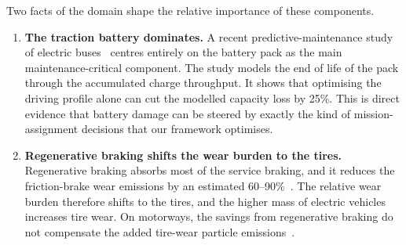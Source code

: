 \documentclass[11pt,a4paper]{article}
\theoremstyle{plain}
\theoremstyle{definition}
\theoremstyle{remark}
\begin{document}
Two facts of the domain shape the relative importance of these components.
\begin{enumerate}
  \item \textbf{The traction battery dominates.}
    A recent predictive-maintenance study of electric buses~\cite[Secs.~2,~4.2]{Ibrahim2025} centres entirely on the battery pack as the main maintenance-critical component.
    The study models the end of life of the pack through the accumulated charge throughput.
    It shows that optimising the driving profile alone can cut the modelled capacity loss by 25\%.
    This is direct evidence that battery damage can be steered by exactly the kind of mission-assignment decisions that our framework optimises.
  \item \textbf{Regenerative braking shifts the wear burden to the tires.}
    Regenerative braking absorbs most of the service braking, and it reduces the friction-brake wear emissions by an estimated 60--90\%~\cite[Sec.~6.1]{Fussell2022}.
    The relative wear burden therefore shifts to the tires, and the higher mass of electric vehicles increases tire wear.
    On motorways, the savings from regenerative braking do not compensate the added tire-wear particle emissions~\cite[Sec.~6.1]{Fussell2022}.
\end{enumerate}
\end{document}

